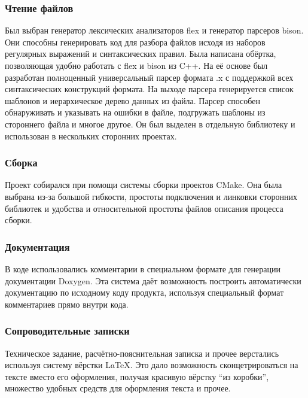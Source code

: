 \documentclass[a4paper,12pt]{report}
\numberwithin{equation}{section}
\begin{document}
\subsubsection{Чтение файлов}
Был выбран генератор лексических анализаторов flex и генератор парсеров bison. Они способны генерировать код для разбора файлов исходя из наборов регулярных выражений и синтаксических правил. Была написана обёртка, позволяющая удобно работать с flex и bison из C++. На её основе был разработан полноценный универсальный парсер формата .x с поддержкой всех синтаксических конструкций формата. На выходе парсера генерируется список шаблонов и иерархическое дерево данных из файла. Парсер способен обнаруживать и указывать на ошибки в файле, подгружать шаблоны из стороннего файла и многое другое. Он был выделен в отдельную библиотеку и использован в нескольких сторонних проектах.

\subsubsection{Сборка}
Проект собирался при помощи системы сборки проектов CMake. Она была выбрана из-за большой гибкости, простоты подключения и линковки сторонних библиотек и удобства и относительной простоты файлов описания процесса сборки.

\subsubsection{Документация}
В коде использовались комментарии в специальном формате для генерации документации Doxygen. Эта система даёт возможность построить автоматически документацию по исходному коду продукта, используя специальный формат комментариев прямо внутри кода.

\subsubsection{Сопроводительные записки}
Техническое задание, расчётно-пояснительная записка и прочее верстались используя систему вёрстки \LaTeX . Это дало возможность сконцетрироваться на тексте вместо его оформления, получая красивую вёрстку ``из коробки'', множество удобных средств для оформления текста и прочее.
\end{document}
